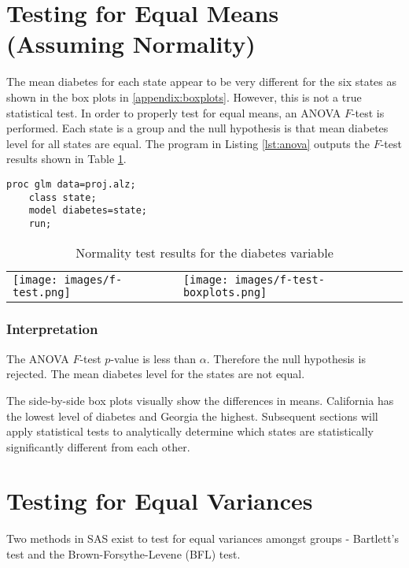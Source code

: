 \documentclass{article}
\begin{document}
\section{Testing for Equal Means (Assuming Normality)}

The mean diabetes for each state appear to be very different for the six states as shown in the box plots in \ref{appendix:boxplots}. However, this is not a true statistical test. In order to properly test for equal means, an ANOVA $F$-test is performed. Each state is a group and the null hypothesis is that mean diabetes level for all states are equal. The program in Listing \ref{lst:anova} outputs the $F$-test results shown in Table \ref{tab:anova}.

\begin{lstlisting}[language=SAS,caption=ANOVA F-test SAS progam,captionpos=b,label=lst:anova]
    proc glm data=proj.alz;
    class state;
    model diabetes=state;
    run;
\end{lstlisting}

\begin{table}[ht]
    \begin{tabular}{ll}
         \texttt{[image: images/f-test.png]} & \texttt{[image: images/f-test-boxplots.png]} \\
    \end{tabular}
    \caption{Normality test results for the diabetes variable}
    \label{tab:anova}
\end{table}

\subsubsection{Interpretation}
The ANOVA $F$-test $p$-value is less than $\alpha$. Therefore the null hypothesis is rejected. The mean diabetes level for the states are not equal. 

The side-by-side box plots visually show the differences in means. California has the lowest level of diabetes and Georgia the highest. Subsequent sections will apply statistical tests to analytically determine which states are statistically significantly different from each other.

\section{Testing for Equal Variances}
Two methods in SAS exist to test for equal variances amongst groups - Bartlett's test and the Brown-Forsythe-Levene (BFL) test.
\end{document}
